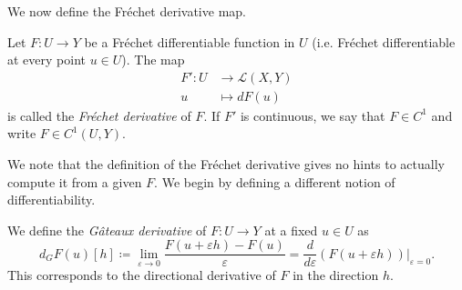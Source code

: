 We now define the Fréchet derivative map.
\begin{definition}
    Let $F:U\to Y$ be a Fréchet differentiable function in $U$ (i.e. Fréchet differentiable at every point $u\in U$). The map
    \begin{equation}
        \begin{aligned}
            F':U &\to \mathcal{L}(X,Y)\\
            u &\mapsto dF(u)
        \end{aligned}
    \end{equation}
    is called the \emph{Fréchet derivative} of $F$. If $F'$ is continuous, we say that $F\in C^1$ and write $F\in C^1(U,Y)$.
\end{definition}

We note that the definition of the Fréchet derivative gives no hints to actually compute it from a given $F$. We begin by defining a different notion of differentiability.
\begin{definition}
    We define the \emph{Gâteaux derivative} of $F:U\to Y$ at a fixed $u\in U$ as
    \begin{equation}\label{eq:gateaux-derivative}
        d_G F(u)[h] \coloneqq \lim_{\varepsilon\to 0} \frac{F(u+\varepsilon h)-F(u)}{\varepsilon} = \frac{d}{d\varepsilon}\left.\left(F(u+\varepsilon h)\right)\right|_{\varepsilon = 0}.
    \end{equation}
    This corresponds to the directional derivative of $F$ in the direction $h$.
\end{definition}

